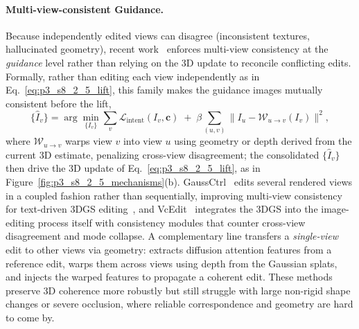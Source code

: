 \paragraph{Multi-view-consistent Guidance.}
Because independently edited views can disagree (inconsistent textures, hallucinated geometry), recent work~\cite{chen2024dge} enforces multi-view consistency at the \emph{guidance} level rather than relying on the 3D update to reconcile conflicting edits.
Formally, rather than editing each view independently as in Eq.~\eqref{eq:p3_s8_2_5_lift}, this family makes the guidance images mutually consistent before the lift,
\begin{equation}
\{\hat{I}_v\} = \arg\min_{\{I_v\}} \sum_{v} \mathcal{L}_{\text{intent}}(I_v,\mathbf{c}) \;+\; \beta\!\!\sum_{(u,v)} \big\| I_u - \mathcal{W}_{u\to v}(I_v) \big\|^2,
\label{eq:p3_s8_2_5_mvc}
\end{equation}
where $\mathcal{W}_{u\to v}$ warps view $v$ into view $u$ using geometry or depth derived from the current 3D estimate, penalizing cross-view disagreement; the consolidated $\{\hat{I}_v\}$ then drive the 3D update of Eq.~\eqref{eq:p3_s8_2_5_lift}, as in Figure~\ref{fig:p3_s8_2_5_mechanisms}(b).
GaussCtrl~\cite{wu2024gaussctrl} edits several rendered views in a coupled fashion rather than sequentially, improving multi-view consistency for text-driven 3DGS editing~\cite{wang2024viewedit,xia2025towardsConsistent}, and VcEdit~\cite{wang2024viewedit} integrates the 3DGS into the image-editing process itself with consistency modules that counter cross-view disagreement and mode collapse.
A complementary line transfers a \emph{single-view} edit to other views via geometry: \citet{gomel2024diffusionBasedAttention} extracts diffusion attention features from a reference edit, warps them across views using depth from the Gaussian splats, and injects the warped features to propagate a coherent edit.
These methods preserve 3D coherence more robustly but still struggle with large non-rigid shape changes or severe occlusion, where reliable correspondence and geometry are hard to come by.

